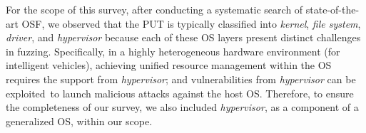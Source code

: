 
For the scope of this survey, after conducting a systematic search of state-of-the-art OSF, we observed that the PUT is typically classified into \textit{kernel}, \textit{file system}, \textit{driver}, and \textit{hypervisor} because each of these OS layers present distinct challenges in fuzzing. Specifically, in a highly heterogeneous hardware environment (\eg for intelligent vehicles), achieving unified resource management within the OS requires the support from \textit{hypervisor}; and vulnerabilities from \textit{hypervisor} can be exploited~to launch malicious attacks against the host OS. Therefore, to ensure the completeness of our survey, we also included \textit{hypervisor}, as a component of a generalized OS, within our scope. 


